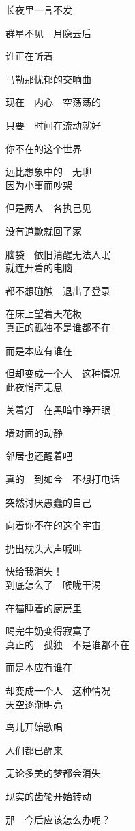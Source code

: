 长夜里一言不发

群星不见　月隐云后

谁正在听着

马勒那忧郁的交响曲

现在　内心　空荡荡的

只要　时间在流动就好

你不在的这个世界

远比想象中的　无聊
\\

因为小事而吵架

但是两人　各执己见

没有道歉就回了家

脑袋　依旧清醒无法入眠
\\

就连开着的电脑

都不想碰触　退出了登录

在床上望着天花板
\\

真正的孤独不是谁都不在

而是本应有谁在

但却变成一个人　这种情况
\\

此夜悄声无息

关着灯　在黑暗中睁开眼

墙对面的动静

邻居也还醒着吧

真的　到如今　不想打电话

突然讨厌愚蠢的自己

向着你不在的这个宇宙

扔出枕头大声喊叫

快给我消失！
\\

到底怎么了　喉咙干渴

在猫睡着的厨房里

喝完牛奶变得寂寞了
\\

真正的　孤独　不是谁都不在

而是本应有谁在

却变成一个人　这种情况
\\

天空逐渐明亮

鸟儿开始歌唱

人们都已醒来

无论多美的梦都会消失

现实的齿轮开始转动

那　今后应该怎么办呢？

